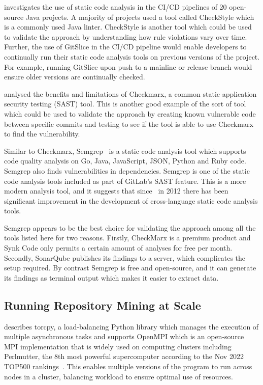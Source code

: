 \cite{java_ci_sca} investigates the use of static code analysis in the CI/CD pipelines of 20 open-source Java projects.
A majority of projects used a tool called CheckStyle which is a commonly used Java linter.
CheckStyle is another tool which could be used to validate the approach by understanding how rule violations vary over time.
Further, the use of GitSlice in the CI/CD pipeline would enable developers to continually run their static code analysis tools on previous versions of the project.
For example, running GitSlice upon push to a mainline or release branch would ensure older versions are continually checked.

\cite{li_2020} analysed the benefits and limitations of Checkmarx, a common static application security testing (SAST) tool.
This is another good example of the sort of tool which could be used to validate the approach by creating known vulnerable code between specific commits and testing to see if the tool is able to use Checkmarx to find the vulnerability.

Similar to Checkmarx, Semgrep~\cite{semgrep} is a static code analysis tool which supports code quality analysis on Go, Java, JavaScript, JSON, Python and Ruby code.
Semgrep also finds vulnerabilities in dependencies.
Semgrep is one of the static code analysis tools included as part of GitLab's SAST feature.
This is a more modern analysis tool, and it suggests that since~\cite{9463095} in 2012 there has been significant improvement in the development of cross-language static code analysis tools.

Semgrep appears to be the best choice for validating the approach among all the tools listed here for two reasons.
Firstly, CheckMarx is a premium product and Synk Code only permits a certain amount of analyses for free per month.
Secondly, SonarQube publishes its findings to a server, which complicates the setup required.
By contrast Semgrep is free and open-source, and it can generate its findings as terminal output which makes it easier to extract data.

\subsection{Running Repository Mining at Scale}
\label{subsec:running-repository-mining-at-scale}

\cite{torcpy} describes torcpy, a load-balancing Python library which manages the execution of multiple asynchronous tasks and supports OpenMPI which is an open-source MPI implementation that is widely used on computing clusters including Perlmutter, the 8th most powerful supercomputer according to the Nov 2022 TOP500 rankings~\cite{perlmutter}.
This enables multiple versions of the program to run across nodes in a cluster, balancing workload to ensure optimal use of resources.

